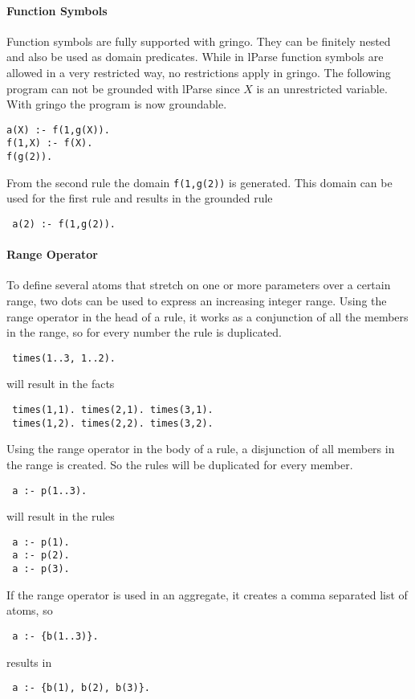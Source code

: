 \documentclass[a4paper,10pt]{article}
\begin{document}
\paragraph{Function Symbols}
Function symbols are fully supported with gringo.
They can be finitely nested and also be used as domain predicates.
While in lParse function symbols are allowed in a very restricted way, no restrictions apply in gringo.
The following program can not be grounded with lParse since $X$ is an unrestricted variable. With gringo the program is now groundable.
\begin{verbatim}
a(X) :- f(1,g(X)).
f(1,X) :- f(X).
f(g(2)).
\end{verbatim}
From the second rule the domain \texttt{f(1,g(2))} is generated.
This domain can be used for the first rule and results in the grounded rule
\begin{verbatim}
 a(2) :- f(1,g(2)).
\end{verbatim}

\paragraph{Range Operator}
To define several atoms that stretch on one or more parameters over a certain range, two dots can be used to express an increasing integer range.
Using the range operator in the head of a rule, it works as a conjunction of all the members in the range, so for every number the rule is duplicated.
\begin{verbatim}
 times(1..3, 1..2).
\end{verbatim}
will result in the facts
\begin{verbatim}
 times(1,1). times(2,1). times(3,1).
 times(1,2). times(2,2). times(3,2).
\end{verbatim}

Using the range operator in the body of a rule, a disjunction of all members in the range is created. So the rules will be duplicated for every member.
\begin{verbatim}
 a :- p(1..3).
\end{verbatim}
will result in the rules
\begin{verbatim}
 a :- p(1).
 a :- p(2).
 a :- p(3).
\end{verbatim}
If the range operator is used in an aggregate, it creates a comma separated list of atoms, so
\begin{verbatim}
 a :- {b(1..3)}.
\end{verbatim}
results in
\begin{verbatim}
 a :- {b(1), b(2), b(3)}.
\end{verbatim}
\end{document}
